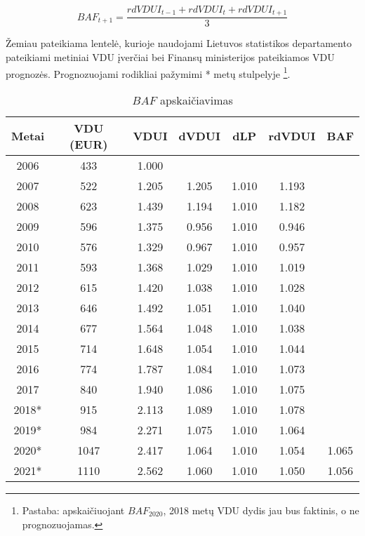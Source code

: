 \documentclass[titlepage, 11pt]{article}
\begin{document}
\begin{equation}
BAF_{t+1}=\frac{rdVDUI_{t-1}+rdVDUI_{t}+rdVDUI_{t+1}}{3}
\end{equation}

Žemiau pateikiama lentelė, kurioje naudojami Lietuvos statistikos departamento pateikiami metiniai VDU įverčiai bei Finansų ministerijos pateikiamos VDU prognozės. Prognozuojami rodikliai pažymimi * metų stulpelyje \footnote{Pastaba: apskaičiuojant $BAF_{2020}$, 2018 metų VDU dydis jau bus faktinis, o ne prognozuojamas.}.

\begin{table}[H]
\begin{center}
\begin{tabular}{|c|c|c|c|c|c|c|}
\hline
Metai & VDU (EUR) & VDUI  & dVDUI & dLP   & rdVDUI & BAF   \\ \hline
2006  & 433       & 1.000 &       &       &        &       \\ \hline
2007  & 522       & 1.205 & 1.205 & 1.010 & 1.193  &       \\ \hline
2008  & 623       & 1.439 & 1.194 & 1.010 & 1.182  &       \\ \hline
2009  & 596       & 1.375 & 0.956 & 1.010 & 0.946  &       \\ \hline
2010  & 576       & 1.329 & 0.967 & 1.010 & 0.957  &       \\ \hline
2011  & 593       & 1.368 & 1.029 & 1.010 & 1.019  &       \\ \hline
2012  & 615       & 1.420 & 1.038 & 1.010 & 1.028  &       \\ \hline
2013  & 646       & 1.492 & 1.051 & 1.010 & 1.040  &       \\ \hline
2014  & 677       & 1.564 & 1.048 & 1.010 & 1.038  &       \\ \hline
2015  & 714       & 1.648 & 1.054 & 1.010 & 1.044  &       \\ \hline
2016  & 774       & 1.787 & 1.084 & 1.010 & 1.073  &       \\ \hline
2017  & 840       & 1.940 & 1.086 & 1.010 & 1.075  &       \\ \hline
2018*  & 915       & 2.113 & 1.089 & 1.010 & 1.078  &       \\ \hline
2019*  & 984       & 2.271 & 1.075 & 1.010 & 1.064  &       \\ \hline
2020*  & 1047      & 2.417 & 1.064 & 1.010 & 1.054  & 1.065 \\ \hline
2021*  & 1110      & 2.562 & 1.060 & 1.010 & 1.050  & 1.056 \\ \hline
\end{tabular}
\caption{$BAF$ apskaičiavimas}
\end{center}
\end{table}
\end{document}
